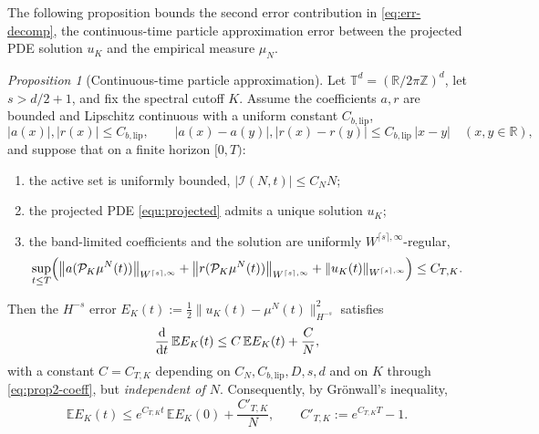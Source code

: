 \documentclass[a4paper,fleqn]{cas-sc}
\theoremstyle{definition}
\theoremstyle{remark}
\newtheorem{proposition}{Proposition}
\begin{document}
The following proposition bounds the second error contribution in \eqref{eq:err-decomp}, the continuous-time particle approximation error between the projected PDE solution $u_K$ and the empirical measure $\mu_N$.
\begin{proposition}[Continuous-time particle approximation]
\label{prop:u_K_mu}
Let $\mathbb T^d=(\mathbb R/2\pi\mathbb Z)^d$, let $s>d/2+1$, and fix the spectral
cutoff $K$. Assume the coefficients $a,r$ are bounded and Lipschitz continuous
with a uniform constant $C_{b,\mathrm{lip}}$,
\[
  |a(x)|,|r(x)|\le C_{b,\mathrm{lip}},\qquad
  |a(x)-a(y)|,|r(x)-r(y)|\le C_{b,\mathrm{lip}}\,|x-y|
  \quad(x,y\in\mathbb R),
\]
and suppose that on a finite horizon $[0,T)$:
\begin{enumerate}
\item[(i)] the active set is uniformly bounded, $|\mathcal I(N,t)|\le C_N N$;
\item[(ii)] the projected PDE \eqref{equ:projected} admits a unique solution $u_K$;
\item[(iii)] the band-limited coefficients and the solution are uniformly
$W^{\lceil s\rceil,\infty}$-regular,
\begin{equation}\label{eq:prop2-coeff}
\sup_{t\le T}\Bigl(\bigl\|a(\mathcal P_K\mu^N(t))\bigr\|_{W^{\lceil s\rceil,\infty}}
+\bigl\|r(\mathcal P_K\mu^N(t))\bigr\|_{W^{\lceil s\rceil,\infty}}
+\|u_K(t)\|_{W^{\lceil s\rceil,\infty}}\Bigr)\le C_{T,K}.
\end{equation}
\end{enumerate}
Then the $H^{-s}$ error $E_K(t):=\tfrac12\|u_K(t)-\mu^N(t)\|_{H^{-s}}^2$ satisfies
\[
\frac{\mathrm{d}}{\mathrm{d} t}\,\mathbb E E_K(t)\le C\,\mathbb E E_K(t)+\frac{C}{N},
\]
with a constant $C=C_{T,K}$ depending on $C_N,C_{b,\mathrm{lip}},D,s,d$ and on $K$
through \eqref{eq:prop2-coeff}, but \emph{independent of $N$}. Consequently, by
Gr\"onwall's inequality,
\[
\mathbb E E_K(t)\le e^{C_{T,K}t}\,\mathbb E E_K(0)+\frac{C'_{T,K}}{N},
\qquad C'_{T,K}:=e^{C_{T,K}T}-1.
\]
\end{proposition}
\end{document}

